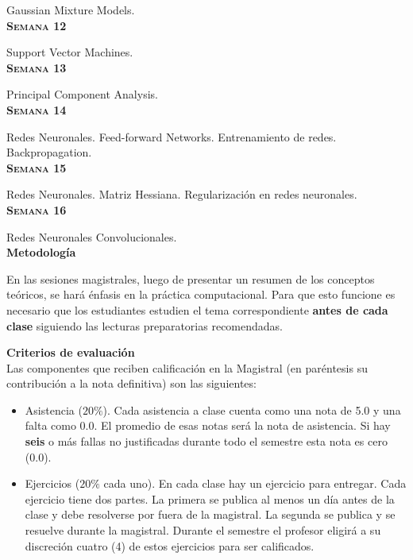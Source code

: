 \documentclass[letterpaper,10pt,onecolumn]{article}
\begin{document}
Gaussian Mixture Models.
\\[-0.3cm]


\noindent\textbf{\textsc{Semana 12}}

Support Vector Machines.
\\[-0.3cm]

\noindent\textbf{\textsc{Semana 13}}

Principal Component Analysis.
\\[-0.3cm]


\noindent\textbf{\textsc{Semana 14}}

Redes Neuronales. Feed-forward Networks. Entrenamiento de redes.
Backpropagation. %
\\[-0.3cm]

\noindent\textbf{\textsc{Semana 15}}

Redes Neuronales. Matriz Hessiana. Regularizaci\'on en redes
neuronales. 
\\[-0.3cm]

\noindent\textbf{\textsc{Semana 16}}

Redes Neuronales Convolucionales.
\\[0.1cm]


\vspace*{0.5cm} 
\noindent\textbf{\large {} \quad
  Metodolog\'ia}\\[-0.2cm] 


\noindent\normalsize 

En las sesiones magistrales, luego de presentar un resumen de
los conceptos te\'oricos, se har\'a \'enfasis en la pr\'actica computacional.
Para que esto funcione es necesario que los estudiantes estudien el
tema correspondiente {\bf antes de cada clase} siguiendo las lecturas
preparatorias recomendadas.

\vspace*{0.5cm} 
\noindent\textbf{\large {} \quad Criterios de
  evaluaci\'on}\\[-0.2cm] 

Las componentes que reciben calificaci\'on en la Magistral (en
par\'entesis su contribuci\'on a la nota definitiva) son las
siguientes:  

\begin{itemize}
\item Asistencia ($20\%$). Cada asistencia a clase cuenta como una
  nota de 5.0 y una falta como 0.0. El promedio de esas notas ser\'a
  la nota de asistencia. 
  Si hay {\bf seis} o m\'as fallas no justificadas durante todo el
  semestre esta nota es cero (0.0).
\item Ejercicios ($20\%$ cada uno). En cada clase hay un ejercicio para
  entregar. Cada ejercicio tiene dos partes. 
  La primera se publica al menos un d\'ia antes de la clase y debe
  resolverse por fuera de la magistral. 
  La segunda se publica y se resuelve durante la magistral.
  Durante el semestre el profesor eligir\'a a su discreci\'on cuatro (4)
  de estos ejercicios para ser calificados. 
\end{itemize}
\end{document}
